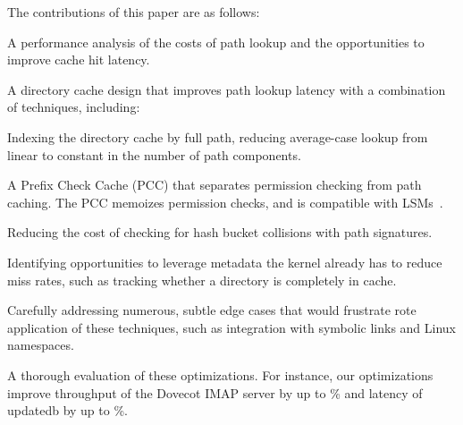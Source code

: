 The contributions of this paper are as follows:
\begin{compactitem}
\item A performance analysis of the costs of path lookup and the opportunities
to improve cache hit latency.
\item A directory cache design that improves path lookup latency with a combination of techniques, including:
  \begin{compactitem}
  \item Indexing the directory cache by full path, reducing average-case lookup from linear to constant in the number of path components.
  \item A Prefix Check Cache (PCC) that separates permission checking from path caching.  The PCC memoizes permission checks, and is compatible with LSMs~\cite{wright+lsm}.
  \item Reducing the cost of checking for hash bucket collisions with path signatures.
  \end{compactitem}
\item Identifying opportunities to leverage metadata the kernel already has to reduce miss rates, such as tracking whether a directory is completely in cache.
\item Carefully addressing numerous, subtle edge cases that would frustrate rote application of these techniques, such as integration with symbolic links and Linux namespaces.
\item A thorough evaluation of these optimizations.  For instance, our optimizations improve throughput
of the Dovecot IMAP server by up to \dovecotspeedup\% and latency of 
updatedb by up to \updatedbspeedup{}\%.

\end{compactitem}



